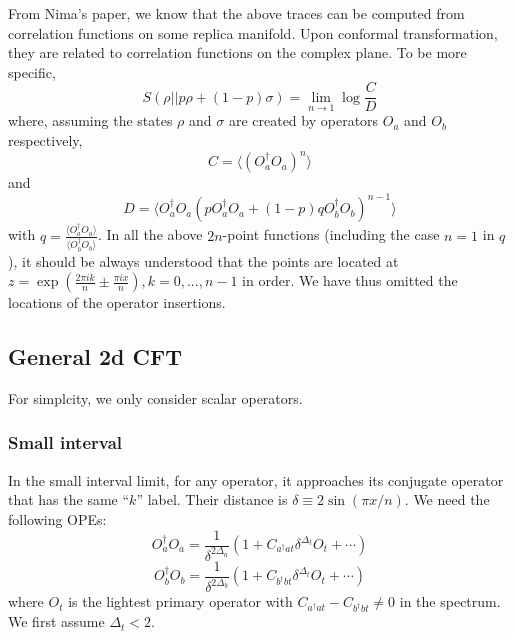 \documentclass{article}
\theoremstyle{plain}
\theoremstyle{definition}
\theoremstyle{plain}
\def\la{\langle}
\def\ra{\rangle}
\begin{document}
From Nima's paper, we know that the above traces can be computed from correlation functions on some replica manifold. Upon conformal transformation, they are related to correlation functions on the complex plane. To be more specific, 
\begin{equation}
    S(\rho||p\rho+(1-p)\sigma)= \lim_{n\to 1} \log \frac{C}{D}
\end{equation}
where, assuming the states $\rho$ and $\sigma$ are created by operators $O_a$ and $O_b$ respectively,
\begin{equation}
    C=\la (O_a^\dagger O_{a})^n \ra
\end{equation} and 
\begin{equation}
    D=\la O_a^\dagger O_{a} (p O_a^\dagger O_{a} +(1-p)q O_b^\dagger O_{b})^{n-1} \ra
\end{equation}
with $q=\frac{\la O_a^\dagger O_{a} \ra}{\la O_b^\dagger O_{b} \ra}$. In all the above $2n$-point functions (including the case $n=1$ in $q$), it should be always understood that the points are located at $z=\exp \left( \frac{2\pi i k}{n} \pm \frac{\pi i x }{n} \right),k=0,...,n-1$ in order. We have thus omitted the locations of the operator insertions.

\subsection{General 2d CFT}
For simplcity, we only consider scalar operators. 
\subsubsection{Small interval}
In the small interval limit, for any operator, it approaches its conjugate operator that has the same ``$k$'' label. Their distance is $\delta \equiv 2 \sin (\pi x/n)$. We need the following OPEs:
\begin{equation}
    O_a^\dagger O_a= \frac{1}{\delta^{2\Delta_a}} \left(1+  C_{a^\dagger at} \delta^{\Delta_t} O_t+\cdots\right)
\end{equation}
\begin{equation}
    O_b^\dagger O_b= \frac{1}{\delta^{2\Delta_b}} \left(1+  C_{b^\dagger bt} \delta^{\Delta_t} O_t+\cdots\right)
\end{equation}
where $O_t$ is the lightest primary operator with $C_{a^\dagger at}-C_{b^\dagger bt}\neq 0$ in the spectrum. We first assume $\Delta_t < 2$.
\end{document}
